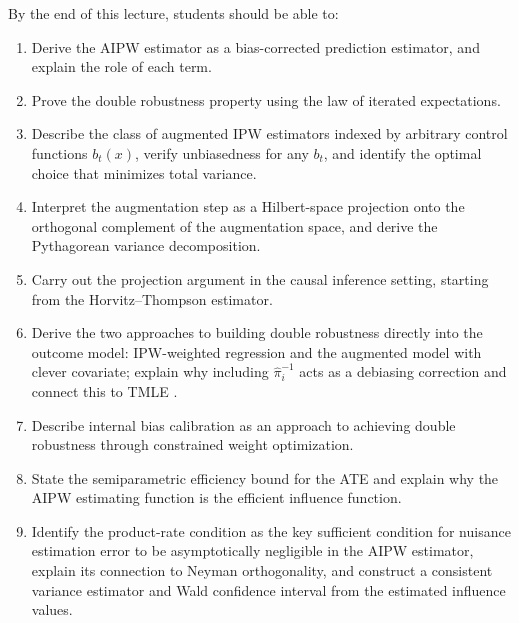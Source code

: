 \documentclass[master.tex]{subfiles}
\begin{document}
\begin{tcolorbox}[defstyle, title={Learning Objectives}]
By the end of this lecture, students should be able to:
\begin{enumerate}
  \item Derive the AIPW estimator as a bias-corrected prediction
    estimator, and explain the role of each term.
  \item Prove the double robustness property using the law of
    iterated expectations.
  \item Describe the class of augmented IPW estimators indexed by
    arbitrary control functions $b_t(x)$, verify unbiasedness for
    any $b_t$, and identify the optimal choice that minimizes total
    variance.
  \item Interpret the augmentation step as a Hilbert-space projection
    onto the orthogonal complement of the augmentation space, and
    derive the Pythagorean variance decomposition.
  \item Carry out the projection argument in the causal inference
    setting, starting from the Horvitz--Thompson estimator.
  \item Derive the two approaches to building double robustness
    directly into the outcome model: IPW-weighted regression and the
    augmented model with clever covariate; explain why including
    $\hat\pi_i^{-1}$ acts as a debiasing correction and connect this
    to TMLE \citep{vanderLaan2006targeted}.
  \item Describe internal bias calibration as an approach to achieving
    double robustness through constrained weight optimization.
  \item State the semiparametric efficiency bound for the ATE and
    explain why the AIPW estimating function is the efficient
    influence function.
  \item Identify the product-rate condition as the key sufficient
    condition for nuisance estimation error to be asymptotically
    negligible in the AIPW estimator, explain its connection to
    Neyman orthogonality, and construct a consistent variance
    estimator and Wald confidence interval from the estimated
    influence values.
\end{enumerate}
\end{tcolorbox}


\end{document}
